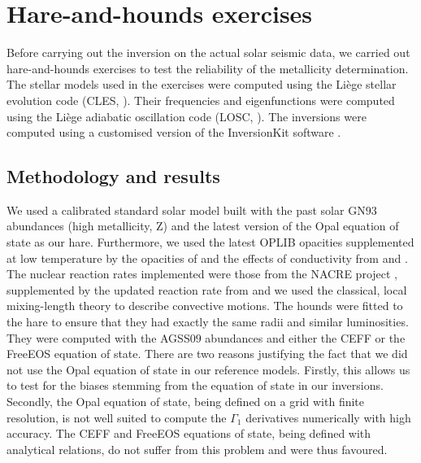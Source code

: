 \documentclass[a4paper,fleqn,usenatbib]{mnras}
\begin{document}
\section{Hare-and-hounds exercises} \label{sec:harehounds}
Before carrying out the inversion on the actual solar seismic data, we carried out hare-and-hounds exercises to test the reliability of the metallicity determination. The stellar models used in the exercises were computed using the Li\`ege stellar evolution code (CLES, \citet{ScuflaireCles}). Their frequencies and eigenfunctions were computed using the Li\`ege adiabatic oscillation code (LOSC, \citet{ScuflaireLosc}). The inversions were computed using a customised version of the InversionKit software \citep{Reese}.

\subsection{Methodology and results}\label{Res}

We used a calibrated standard solar model built with the past solar GN$93$ \citep{GN93} abundances (high metallicity, Z) and the latest version of the Opal equation of state \citep{Rogerseos} as our hare. Furthermore, we used the latest OPLIB opacities \citep{Colgan} supplemented at low temperature by the opacities of \citet{Ferguson} and the effects of conductivity from \citet{Potekhin} and \citet{Cassisi}. The nuclear reaction rates implemented were those from the NACRE project \citep{Nacre}, supplemented by the updated reaction rate from \citet{Formicola} and we used the classical, local mixing-length theory \citep{Bohm} to describe convective motions. The hounds were fitted to the hare to ensure that they had exactly the same radii and similar luminosities. They were computed with the AGSS$09$ abundances and either the CEFF or the FreeEOS equation of state. There are two reasons justifying the fact that we did not use the Opal equation of state in our reference models. Firstly, this allows us to test for the biases stemming from the equation of state in our inversions. Secondly, the Opal equation of state, being defined on a grid with finite resolution, is not well suited to compute the $\Gamma_{1}$ derivatives numerically with high accuracy. The CEFF and FreeEOS equations of state, being defined with analytical relations, do not suffer from this problem and were thus favoured. 
\end{document}

